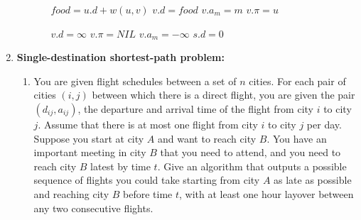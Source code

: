 \documentclass{book}
\begin{document}
\begin{enumerate}
\begin{enumerate}
\begin{itemize}
\begin{algorithm*}[h!]
\begin{algorithmic}[1]
                                    \State $food = u.d + w(u, v)$
                                            \State $v.d = food$
                                            \State $v.a_m = m$
                                            \State $v.\pi = u$
                                    \EndIf
                            \EndFunction
                    \end{algorithmic}
            \end{algorithm*}
            \begin{algorithm*}[h!]
                    \begin{algorithmic}
                                            \State $v.d = \infty$
                                            \State $v.\pi = NIL$
                                            \State $v.a_m = -\infty$
                                    \EndFor
                                    \State $s.d = 0$
                            \EndFunction
                    \end{algorithmic}
            \end{algorithm*}
            \FloatBarrier
		\end{itemize}
	\end{enumerate}
	\item \textbf{Single-destination shortest-path problem:}
	\begin{enumerate}
		\item You are given flight schedules between a set of $n$ cities. For each pair of cities $(i, j)$ between which there is a direct flight, you are given the pair $(d_{ij}, a_{ij})$, the departure and arrival time of the flight from city $i$ to city $j$. Assume that there is at most one flight from city $i$ to city $j$ per day. Suppose you start at city $A$ and want to reach city $B$. You have an important meeting in city $B$ that you need to attend, and you need to reach city $B$ latest by time $t$. Give an algorithm that outputs a possible sequence of flights you could take starting from city $A$ as late as possible and reaching city $B$ before time $t$, with at least one hour layover between any two consecutive flights.
		\begin{itemize}

\end{itemize}
\end{enumerate}
\end{enumerate}
\end{document}

